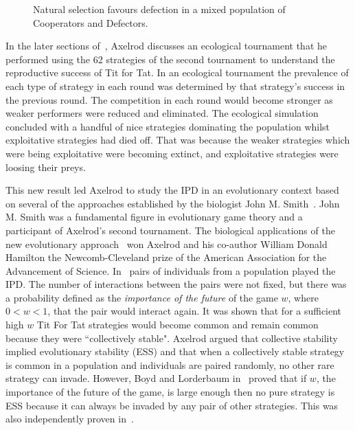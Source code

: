 \begin{figure}[!hbtp]
    \centering
    
    \caption{Natural selection favours defection in a mixed population of Cooperators
    and Defectors.}\label{fig:natural_selection_diagram}
\end{figure}

In the later sections of~\cite{Axelrod1980b}, Axelrod discusses an
ecological tournament that he performed using the 62 strategies of the second
tournament to understand the reproductive success of Tit for Tat. In an
ecological tournament the prevalence of each type of strategy in each round was
determined by that strategy's success in the previous round. The competition in
each round would become stronger as weaker performers were reduced and
eliminated. The ecological simulation concluded with a handful of nice
strategies dominating the population whilst exploitative strategies had died off.
That was because the weaker strategies which were being exploitative were becoming
extinct, and exploitative strategies were loosing their preys.

This new result led Axelrod to
study the IPD in an evolutionary context based on several of the approaches
established by the biologist John M. Smith~\cite{Smith1974,
Smith1979, Smith1973}. John M. Smith was a fundamental figure in evolutionary game theory and a
participant of Axelrod's second tournament. The biological applications of the
new evolutionary approach~\cite{Axelrod1981} won Axelrod and his co-author William
Donald Hamilton the
Newcomb-Cleveland prize of the American Association for the Advancement of
Science.
In~\cite{Axelrod1981} pairs of individuals from a
population played the IPD. The number of interactions between the pairs were
not fixed, but there was a probability defined as the \textit{importance of the future}
of the game \(w\), where \(0 < w < 1\), that the pair would interact again. It
was shown that for
a sufficient high \(w\) Tit For Tat strategies
would become common and remain common because they were ``collectively stable".
Axelrod argued that collective stability implied evolutionary stability (ESS)
and that when a collectively stable strategy is common in a population and
individuals are paired randomly, no other rare strategy can invade. However,
Boyd and Lorderbaum in~\cite{Boyd1987} proved that if \(w\), the importance of the
future of the game, is large enough then no pure strategy is ESS because it can
always be invaded by any pair of other strategies. This was also independently
proven in~\cite{Pudaite1987}.

